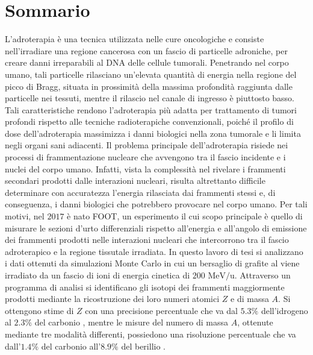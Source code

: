 \documentclass[12pt,a4paper,twoside]{report}
\begin{document}
	\chapter*{Sommario}
	L'adroterapia è una tecnica utilizzata nelle cure oncologiche e consiste nell'irradiare una regione cancerosa con un fascio di particelle adroniche, per creare danni irreparabili al DNA delle cellule tumorali. Penetrando nel corpo umano, tali particelle rilasciano un'elevata quantità di energia nella regione del picco di Bragg, situata in prossimità della massima profondità raggiunta dalle particelle nei tessuti, mentre il rilascio nel canale di ingresso è piuttosto basso. Tali caratteristiche rendono l'adroterapia più adatta per trattamento di tumori profondi rispetto alle tecniche radioterapiche convenzionali, poiché il profilo di dose dell'adroterapia massimizza i danni biologici nella zona tumorale e li limita negli organi sani adiacenti. Il problema principale dell'adroterapia risiede nei processi di frammentazione nucleare che avvengono tra il fascio incidente e i nuclei del corpo umano. Infatti, vista la complessità nel rivelare i frammenti secondari prodotti dalle interazioni nucleari, risulta altrettanto difficile determinare con accuratezza l'energia rilasciata dai frammenti stessi e, di conseguenza, i danni biologici che potrebbero provocare nel corpo umano. Per tali motivi, nel $2017$ è nato FOOT, un esperimento il cui scopo principale è quello di misurare le sezioni d'urto differenziali rispetto all'energia e all'angolo di emissione dei frammenti prodotti nelle interazioni nucleari che intercorrono tra il fascio adroterapico e la regione tissutale irradiata. In questo lavoro di tesi si analizzano i dati ottenuti da simulazioni Monte Carlo in cui un bersaglio di grafite al  viene irradiato da un fascio di ioni  di energia cinetica di $200 \mbox{ MeV/u}$. Attraverso un programma di analisi si identificano gli isotopi dei frammenti maggiormente prodotti mediante la ricostruzione dei loro numeri atomici $Z$ e di massa $A$. Si ottengono stime di $Z$ con una precisione percentuale che va dal $5.3\%$ dell'idrogeno  al $2.3\%$ del carbonio , mentre le misure del numero di massa $A$, ottenute mediante tre modalità differenti, possiedono una risoluzione percentuale che va dall'$1.4\%$ del carbonio  all'$8.9\%$ del berillio .
	\newpage
	\tableofcontents
	\newpage
\end{document}
